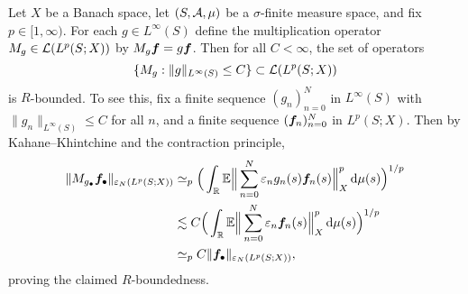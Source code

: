 \begin{example}\label{eg:R-bounded-multipliers}
  Let $X$ be a Banach space, let $(S,\mathcal{A},\mu)$ be a $\sigma$-finite measure space, and fix $p \in [1,\infty)$.
  For each $g \in L^\infty(S)$ define the multiplication operator $M_{g} \in \mathcal{L}(L^p(S;X))$ by $M_{g}\bm{f} = g\bm{f}$.
  Then for all $C < \infty$, the set of operators
  \begin{equation*}
    \{M_{g}  : \|g\|_{L^\infty(S)} \leq C\} \subset \mathcal{L}(L^{p}(S;X))
  \end{equation*}
  is $R$-bounded.
  To see this, fix a finite sequence $(g_{n})_{n=0}^{N}$ in $L^\infty(S)$ with $\|g_{n}\|_{L^\infty(S)} \leq C$ for all $n$, and a finite sequence $(\bm{f}_{n})_{n=0}^{N}$ in $L^p(S;X)$.
  Then by Kahane--Khintchine and the contraction principle,
  \begin{equation*}
    \begin{aligned}
      \| M_{g_{\bullet}} \bm{f}_{\bullet} \|_{\varepsilon_{N}(L^p(S;X))}
      &\simeq_{p} \Big( \int_{\mathbb{R}} \mathbb{E} \Big\| \sum_{n=0}^{N} \varepsilon_{n} g_{n}(s) \bm{f}_{n}(s) \Big\|_{X}^{p} \, \mathrm{d}\mu(s) \Big)^{1/p} \\
      &\lesssim C \Big( \int_{\mathbb{R}} \mathbb{E} \Big\| \sum_{n=0}^{N} \varepsilon_{n} \bm{f}_{n}(s) \Big\|_{X}^{p} \, \mathrm{d}\mu(s) \Big)^{1/p} \\
      &\simeq_{p} C \| \bm{f}_{\bullet} \|_{\varepsilon_{N}(L^p(S;X))},
    \end{aligned}
  \end{equation*}
  proving the claimed $R$-boundedness.
\end{example}

